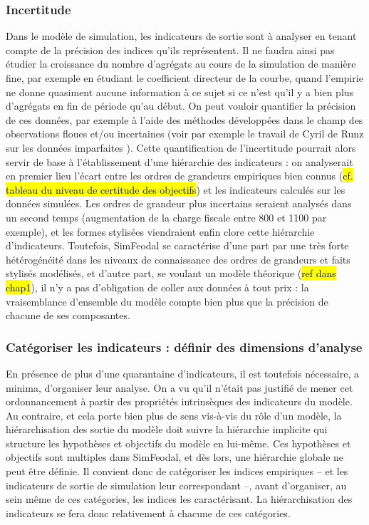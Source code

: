 \subsubsection{Incertitude}\label{sssec:incertitude}
Dans le modèle de simulation, les indicateurs de sortie sont à analyser en tenant compte de la précision des indices qu'ils représentent.
Il ne faudra ainsi pas étudier la croissance du nombre d'agrégats au cours de la simulation de manière fine, par exemple en étudiant le coefficient directeur de la courbe, quand l'empirie ne donne quasiment aucune information à ce sujet si ce n'est qu'il y a bien plus d'agrégats en fin de période qu'au début.
On peut vouloir quantifier la précision de ces données, par exemple à l'aide des méthodes développées dans le champ des observations floues et/ou incertaines (voir par exemple le travail de Cyril de Runz sur les données \og imparfaites\fg{} \autocite{de2008imperfection}).
Cette quantification de l'incertitude pourrait alors servir de base à l'établissement d'une hiérarchie des indicateurs :
on analyserait en premier lieu l'écart entre les ordres de grandeurs empiriques bien connus (\hl{cf. tableau du niveau de certitude des objectifs}) et les indicateurs calculés sur les données simulées.
Les ordres de grandeur plus incertains seraient analysés dans un second temps (augmentation de la charge fiscale entre 800 et 1100 par exemple), et les formes stylisées viendraient enfin clore cette hiérarchie d'indicateurs.
Toutefois, SimFeodal se caractérise d'une part par une très forte hétérogénéité dans les niveaux de connaissance des ordres de grandeurs et faits stylisés modélisés, et d'autre part, se voulant un modèle théorique (\hl{ref dans chap1}), il n'y a pas d'obligation de \og coller aux données\fg{} à tout prix :
la vraisemblance d'ensemble du modèle compte bien plus que la précision de chacune de ses composantes.


\subsubsection{Catégoriser les indicateurs : définir des dimensions d'analyse}
En présence de plus d'une quarantaine d'indicateurs, il est toutefois nécessaire, a minima, d'organiser leur analyse.
On a vu qu'il n'était pas justifié de mener cet ordonnancement à partir des propriétés intrinsèques des indicateurs du modèle.
Au contraire, et cela porte bien plus de sens vis-à-vis du rôle d'un modèle, la hiérarchisation des sortie du modèle doit suivre la hiérarchie implicite qui structure les hypothèses et objectifs du modèle en lui-même.
Ces hypothèses et objectifs sont multiples dans SimFeodal, et dès lors, une hiérarchie globale ne peut être définie.
Il convient donc de catégoriser les indices empiriques -- et les indicateurs de sortie de simulation leur correspondant --, avant d'organiser, au sein même de ces catégories, les indices les caractérisant.
La hiérarchisation des indicateurs se fera donc relativement à chacune de ces catégories.

